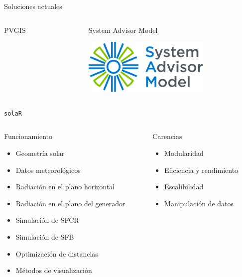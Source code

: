 \documentclass[aspectratio=169, usenames,svgnames,dvipsnames]{beamer}
\begin{document}
\begin{frame}[label={sec:orgf829f9e}]{Soluciones actuales}
\begin{columns}
\begin{column}{0.2\columnwidth}
\begin{block}{\alert{PVGIS}}
\begin{center}
\end{center}
\end{block}
\end{column}
\begin{column}{0.2\columnwidth}
\begin{block}{\alert{System Advisor Model}}
\begin{center}
\includegraphics[width=\textwidth]{../figuras/SAM-logo-horizontal.png}
\end{center}
\end{block}
\end{column}
\end{columns}
\end{frame}
\begin{frame}[label={sec:orgbd8b20c},fragile]{\texttt{solaR}}
 \begin{columns}
\begin{column}{0.45\columnwidth}
\begin{block}{Funcionamiento}
\begin{itemize}
\item Geometría solar
\item Datos meteorológicos
\item Radiación en el plano horizontal
\item Radiación en el plano del generador
\item Simulación de SFCR
\item Simulación de SFB
\item Optimización de distancias
\item Métodos de visualización
\end{itemize}
\end{block}
\end{column}
\begin{column}{0.45\columnwidth}
\begin{block}{Carencias}
\begin{itemize}
\item Modularidad
\item Eficiencia y rendimiento
\item Escalibilidad
\item Manipulación de datos
\end{itemize}
\end{block}
\end{column}
\end{columns}
\end{frame}
\end{document}
